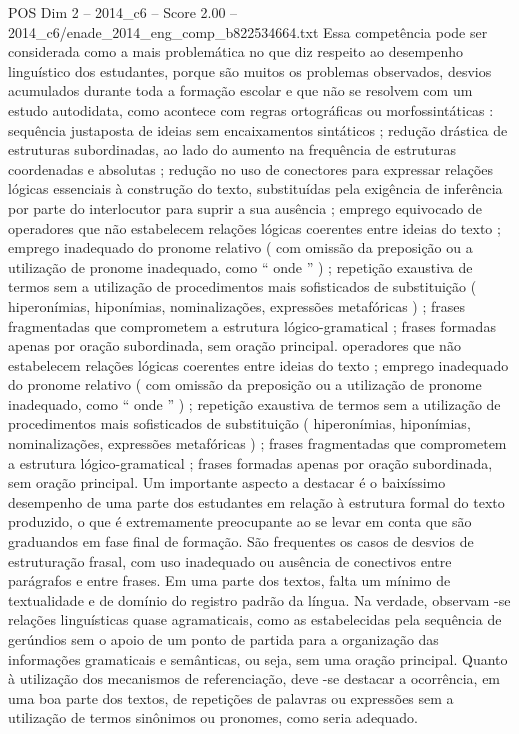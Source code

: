 \begin{textsample}{POS Dim 2 – 2014\_c6 – Score 2.00 – 2014\_c6/enade\_2014\_eng\_comp\_b822534664.txt}
Essa competência pode ser considerada como a mais problemática no que diz respeito ao desempenho linguístico dos estudantes, porque são muitos os problemas observados, desvios acumulados durante toda a formação escolar e que não se resolvem com um estudo autodidata, como acontece com regras ortográficas ou morfossintáticas : sequência justaposta de ideias sem encaixamentos sintáticos ; redução drástica de estruturas subordinadas, ao lado do aumento na frequência de estruturas coordenadas e absolutas ; redução no uso de conectores para expressar relações lógicas essenciais à construção do texto, substituídas pela exigência de inferência por parte do interlocutor para suprir a sua ausência ; emprego equivocado de operadores que não estabelecem relações lógicas coerentes entre ideias do texto ; emprego inadequado do pronome relativo ( com omissão da preposição ou a utilização de pronome inadequado, como “ onde ” ) ; repetição exaustiva de termos sem a utilização de procedimentos mais sofisticados de substituição ( hiperonímias, hiponímias, nominalizações, expressões metafóricas ) ; frases fragmentadas que comprometem a estrutura lógico-gramatical ; frases formadas apenas por oração subordinada, sem oração principal. operadores que não estabelecem relações lógicas coerentes entre ideias do texto ; emprego inadequado do pronome relativo ( com omissão da preposição ou a utilização de pronome inadequado, como “ onde ” ) ; repetição exaustiva de termos sem a utilização de procedimentos mais sofisticados de substituição ( hiperonímias, hiponímias, nominalizações, expressões metafóricas ) ; frases fragmentadas que comprometem a estrutura lógico-gramatical ; frases formadas apenas por oração subordinada, sem oração principal.
Um importante aspecto a destacar é o baixíssimo desempenho de uma parte dos estudantes em relação à estrutura formal do texto produzido, o que é extremamente preocupante ao se levar em conta que são graduandos em fase final de formação.
São frequentes os casos de desvios de estruturação frasal, com uso inadequado ou ausência de conectivos entre parágrafos e entre frases.
Em uma parte dos textos, falta um mínimo de textualidade e de domínio do registro padrão da língua.
Na verdade, observam -se relações linguísticas quase agramaticais, como as estabelecidas pela sequência de gerúndios sem o apoio de um ponto de partida para a organização das informações gramaticais e semânticas, ou seja, sem uma oração principal.
Quanto à utilização dos mecanismos de referenciação, deve -se destacar a ocorrência, em uma boa parte dos textos, de repetições de palavras ou expressões sem a utilização de termos sinônimos ou pronomes, como seria adequado.

\end{textsample}
